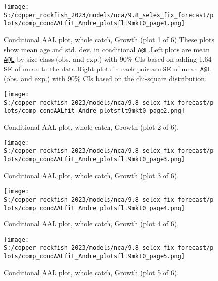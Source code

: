 \documentclass[11pt,
  english,
  letterpaper,
]{article}
\begin{document}
\begin{figure}
\centering
\texttt{[image: S:/copper\_rockfish\_2023/models/nca/9.8\_selex\_fix\_forecast/plots/comp\_condAALfit\_Andre\_plotsflt9mkt0\_page1.png]}
\caption{Conditional AAL plot, whole catch, Growth (plot 1 of 6) These plots show mean age and std. dev. in conditional \href{mailto:A@L}{\nolinkurl{A@L}}.Left plots are mean \href{mailto:A@L}{\nolinkurl{A@L}} by size-class (obs. and exp.) with 90\% CIs based on adding 1.64 SE of mean to the data.Right plots in each pair are SE of mean \href{mailto:A@L}{\nolinkurl{A@L}} (obs. and exp.) with 90\% CIs based on the chi-square distribution.\label{fig:comp_condAALfit_Andre_plotsflt9mkt0_page1}}
\end{figure}

\begin{figure}
\centering
\texttt{[image: S:/copper\_rockfish\_2023/models/nca/9.8\_selex\_fix\_forecast/plots/comp\_condAALfit\_Andre\_plotsflt9mkt0\_page2.png]}
\caption{Conditional AAL plot, whole catch, Growth (plot 2 of 6).\label{fig:comp_condAALfit_Andre_plotsflt9mkt0_page2}}
\end{figure}

\begin{figure}
\centering
\texttt{[image: S:/copper\_rockfish\_2023/models/nca/9.8\_selex\_fix\_forecast/plots/comp\_condAALfit\_Andre\_plotsflt9mkt0\_page3.png]}
\caption{Conditional AAL plot, whole catch, Growth (plot 3 of 6).\label{fig:comp_condAALfit_Andre_plotsflt9mkt0_page3}}
\end{figure}

\begin{figure}
\centering
\texttt{[image: S:/copper\_rockfish\_2023/models/nca/9.8\_selex\_fix\_forecast/plots/comp\_condAALfit\_Andre\_plotsflt9mkt0\_page4.png]}
\caption{Conditional AAL plot, whole catch, Growth (plot 4 of 6).\label{fig:comp_condAALfit_Andre_plotsflt9mkt0_page4}}
\end{figure}

\begin{figure}
\centering
\texttt{[image: S:/copper\_rockfish\_2023/models/nca/9.8\_selex\_fix\_forecast/plots/comp\_condAALfit\_Andre\_plotsflt9mkt0\_page5.png]}
\caption{Conditional AAL plot, whole catch, Growth (plot 5 of 6).\label{fig:comp_condAALfit_Andre_plotsflt9mkt0_page5}}
\end{figure}
\end{document}
